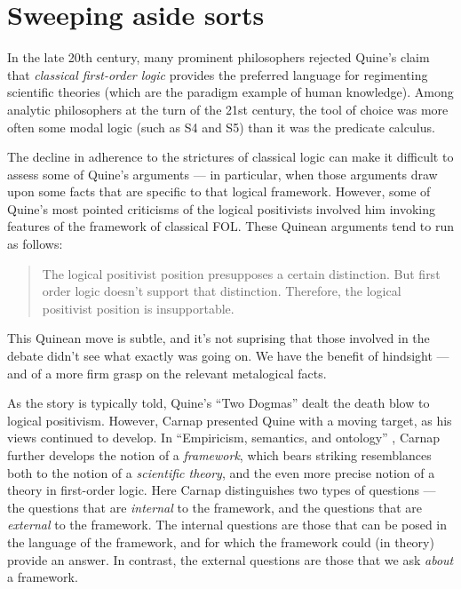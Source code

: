 




\section{Sweeping aside sorts}

In the late 20th century, many prominent philosophers rejected Quine's
claim that {\it classical first-order logic} provides the preferred
language for regimenting scientific theories (which are the paradigm
example of human knowledge).  Among analytic philosophers at the turn
of the 21st century, the tool of choice was more often some modal
logic (such as S4 and S5) than it was the predicate calculus.

The decline in adherence to the strictures of classical logic can make
it difficult to assess some of Quine's arguments --- in particular,
when those arguments draw upon some facts that are specific to that
logical framework.  However, some of Quine's most pointed criticisms
of the logical positivists involved him invoking features of the
framework of classical FOL.  These Quinean arguments tend to run as
follows: \begin{quote} The logical positivist position presupposes a
  certain distinction.  But first order logic doesn't support that
  distinction.  Therefore, the logical positivist position is
  insupportable. \end{quote} This Quinean move is subtle, and it's not
suprising that those involved in the debate didn't see what exactly
was going on.  We have the benefit of hindsight --- and of a more firm
grasp on the relevant metalogical facts.

As the story is typically told, Quine's ``Two Dogmas'' dealt the death
blow to logical positivism.  However, Carnap presented Quine with a
moving target, as his views continued to develop.  In ``Empiricism,
semantics, and ontology'' \citeyearpar{carnap-eso}, Carnap further
develops the notion of a {\it framework}, which bears striking
resemblances both to the notion of a {\it scientific theory}, and the
even more precise notion of a theory in first-order logic.  Here
Carnap distinguishes two types of questions --- the questions that are
{\it internal} to the framework, and the questions that are {\it
  external} to the framework.  The internal questions are those that
can be posed in the language of the framework, and for which the
framework could (in theory) provide an answer.  In contrast, the
external questions are those that we ask {\it about} a framework.


